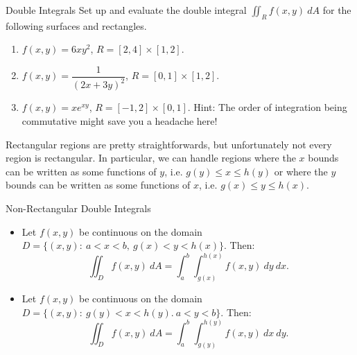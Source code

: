 \begin{pexercise}{Double Integrals}
Set up and evaluate the double integral $\iint_R f(x,y)\ dA$ for the following surfaces and rectangles.
\vspace{1em}
\begin{enumerate}
\item $f(x,y)=6xy^2$, $R=[2,4]\times [1,2]$.%
\vspace{1em}

\item $f(x,y)=\dfrac{1}{(2x+3y)^2}$, $R=[0,1]\times[1,2]$.%
\vspace{1em}

\item $f(x,y)=xe^{xy}$, $R=[-1,2]\times[0,1]$. Hint: The order of integration being commutative might save you a headache here! %
\end{enumerate}
\end{pexercise}

Rectangular regions are pretty straightforwards, but unfortunately not every region is rectangular. In particular, we can handle regions where the $x$ bounds can be written as some functions of $y$, i.e. $g(y)\leq x\leq h(y)$ or where the $y$ bounds can be written as some functions of $x$, i.e. $g(x)\leq y\leq h(x)$.

\begin{definition}{Non-Rectangular Double Integrals}
\begin{itemize}
\item Let $f(x,y)$ be continuous on the domain $D=\{(x,y):\ a<x<b,\ g(x)<y<h(x) \}.$ Then: $$\iint_D f(x,y)\ dA=\int_{a}^{b}\int_{g(x)}^{h(x)}f(x,y)\ dy \ dx. $$
\item Let $f(x,y)$ be continuous on the domain $D=\{(x,y):\ g(y)<x<h(y).\ a<y<b \}. $ Then: $$\iint_{D}f(x,y)\ dA=\int_{a}^b\int_{g(y)}^{h(y)}f(x,y)\ dx \ dy. $$
\end{itemize}
\end{definition}

